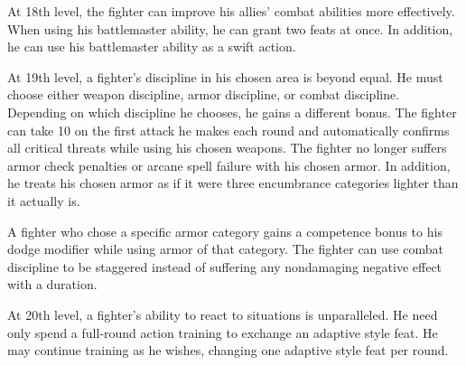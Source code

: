  At 18th level, the fighter can improve his allies' combat abilities more effectively. When using his battlemaster ability, he can grant two feats at once. In addition, he can use his battlemaster ability as a swift action.

 At 19th level, a fighter's discipline in his chosen area is beyond equal. He must choose either weapon discipline, armor discipline, or combat discipline. Depending on which discipline he chooses, he gains a different bonus.
 The fighter can take 10 on the first attack he makes each round and automatically confirms all critical threats while using his chosen weapons.
 The fighter no longer suffers armor check penalties or arcane spell failure with his chosen armor. In addition, he treats his chosen armor as if it were three encumbrance categories lighter than it actually is.
\par A fighter who chose a specific armor category gains a  competence bonus to his dodge modifier while using armor of that category.
 The fighter can use combat discipline to be staggered instead of suffering any nondamaging negative effect with a duration.

 At 20th level, a fighter's ability to react to situations is unparalleled. He need only spend a full-round action training to exchange an adaptive style feat. He may continue training as he wishes, changing one adaptive style feat per round.

